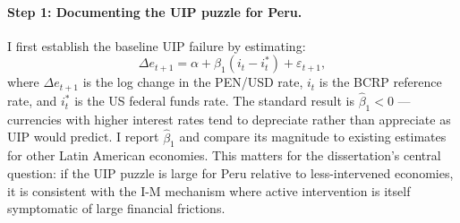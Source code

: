 \documentclass[12pt,a4paper]{article}
\begin{document}
\paragraph{Step 1: Documenting the UIP puzzle for Peru.} I first establish the baseline UIP failure by estimating:
\begin{equation}
    \Delta e_{t+1} = \alpha + \beta_1 (i_t - i^*_t) + \varepsilon_{t+1},
    \label{eq:uip_classic}
\end{equation}
where $\Delta e_{t+1}$ is the log change in the PEN/USD rate, $i_t$ is the BCRP reference rate, and $i^*_t$ is the US federal funds rate. The standard result is $\hat{\beta}_1 < 0$ — currencies with higher interest rates tend to depreciate rather than appreciate as UIP would predict. I report $\hat{\beta}_1$ and compare its magnitude to existing estimates for other Latin American economies. This matters for the dissertation's central question: if the UIP puzzle is large for Peru relative to less-intervened economies, it is consistent with the I-M mechanism where active intervention is itself symptomatic of large financial frictions.
\end{document}
